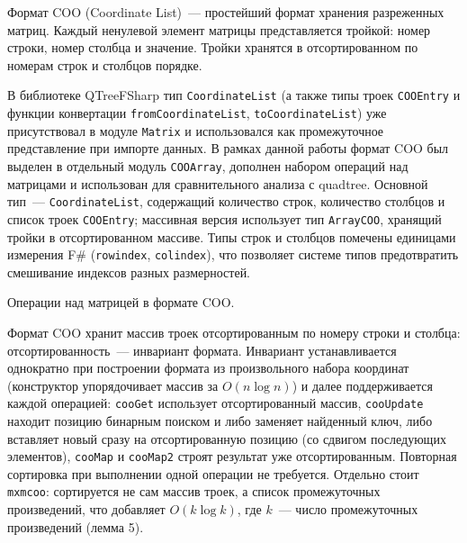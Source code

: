 \documentclass[a4paper]{article}
\begin{document}
Формат COO (Coordinate List)~--- простейший формат хранения разреженных матриц. Каждый ненулевой элемент матрицы представляется тройкой: номер строки, номер столбца и значение. Тройки хранятся в отсортированном по номерам строк и столбцов порядке.

В библиотеке QTreeFSharp тип \texttt{CoordinateList} (а также типы троек \texttt{COOEntry} и функции конвертации \texttt{fromCoordinateList}, \texttt{toCoordinateList}) уже присутствовал в модуле \texttt{Matrix} и использовался как промежуточное представление при импорте данных. В рамках данной работы формат COO был выделен в отдельный модуль \texttt{COOArray}, дополнен набором операций над матрицами и использован для сравнительного анализа с quadtree. Основной тип~--- \texttt{CoordinateList}, содержащий количество строк, количество столбцов и список троек \texttt{COOEntry}; массивная версия использует тип \texttt{ArrayCOO}, хранящий тройки в отсортированном массиве. Типы строк и столбцов помечены единицами измерения F\# (\texttt{rowindex}, \texttt{colindex}), что позволяет системе типов предотвратить смешивание индексов разных размерностей.

Операции над матрицей в формате COO.

Формат COO хранит массив троек отсортированным по номеру строки и столбца: отсортированность~--- инвариант формата. Инвариант устанавливается однократно при построении формата из произвольного набора координат (конструктор упорядочивает массив за $O(n \log n)$) и далее поддерживается каждой операцией: \texttt{cooGet} использует отсортированный массив, \texttt{cooUpdate} находит позицию бинарным поиском и либо заменяет найденный ключ, либо вставляет новый сразу на отсортированную позицию (со сдвигом последующих элементов), \texttt{cooMap} и \texttt{cooMap2} строят результат уже отсортированным. Повторная сортировка при выполнении одной операции не требуется. Отдельно стоит \texttt{mxmcoo}: сортируется не сам массив троек, а список промежуточных произведений, что добавляет $O(k \log k)$, где $k$~--- число промежуточных произведений (лемма 5).
\end{document}

